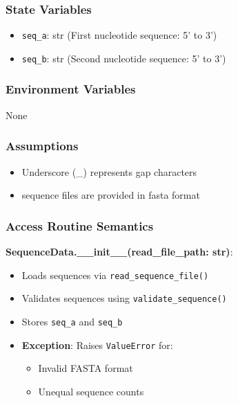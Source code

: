\documentclass[12pt, titlepage]{article}
\begin{document}
\subsubsection{State Variables}

\begin{itemize}
    \item \texttt{seq\_a}: str (First nucleotide sequence: 5' to 3')
    \item \texttt{seq\_b}: str (Second nucleotide sequence: 5' to 3')
\end{itemize}

\subsubsection{Environment Variables}

None

\subsubsection{Assumptions}

\begin{itemize}
    \item Underscore (\_) represents gap characters
    \item sequence files are provided in fasta format
\end{itemize}

\subsubsection{Access Routine Semantics}

\noindent \textbf{SequenceData.\_\_init\_\_(read\_file\_path: str)}:
\begin{itemize}
    \item Loads sequences via \texttt{read\_sequence\_file()}
    \item Validates sequences using \texttt{validate\_sequence()}
    \item Stores \texttt{seq\_a} and \texttt{seq\_b}
    \item \textbf{Exception}: Raises \texttt{ValueError} for:
    \begin{itemize}
        \item Invalid FASTA format
        \item Unequal sequence counts
    \end{itemize}
\end{itemize}
\end{document}
